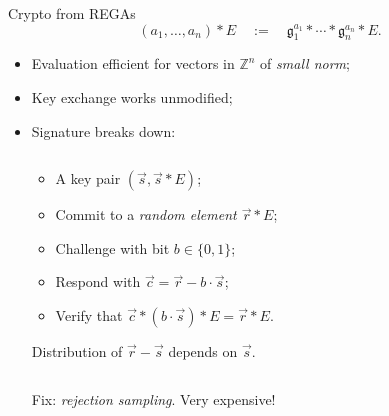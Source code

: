 \documentclass[aspectratio=169]{beamer}
\newcommand{\Z}{ℤ}
\newcommand{\g}{{\mathfrak{g}}}
\begin{document}
\begin{frame}{Crypto from REGAs}
  \[(a_1, \ldots, a_n) * E \quad:=\quad \g_1^{a_1} * \cdots * \g_n^{a_n} * E.\]

  \begin{itemize}
  \item Evaluation efficient for vectors in $\Z^n$ of \emph{small norm};
  \item Key exchange works unmodified;
  \item<2-> Signature breaks down:
    \begin{columns}
      \begin{column}{0.40\textwidth}
        \begin{itemize}
        \item A key pair \emph{$(\vec{s}, \vec{s}*E)$};
        \item Commit to a \emph{random element $\vec{r}*E$};
        \item Challenge with bit \emph{$b\in\{0,1\}$};
        \item \alert{Respond with $\vec{c} = \vec{r} - b\cdot\vec{s}$};
        \item Verify that \emph{$\vec{c}*(b\cdot\vec{s})*E = \vec{r}*E$}.
        \end{itemize}
        Distribution of \alert{$\vec{r}-\vec{s}$} depends on \alert{$\vec{s}$}.
      \end{column}
      \begin{column}{0.40\textwidth}
        \centering
      \end{column}
    \end{columns}

    \medskip
    Fix: \emph{rejection sampling}. Very expensive!
  \end{itemize}
\end{frame}

\end{document}
